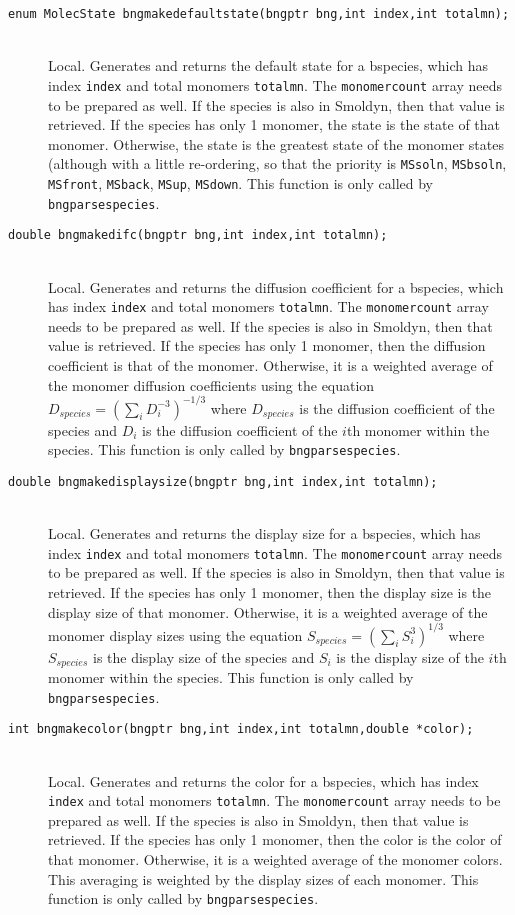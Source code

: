 \documentclass {scrbook}
\newcommand {\ttt} {\texttt}
\begin{document}
\begin{description}
\item[\ttt{enum MolecState bngmakedefaultstate(bngptr bng,int index,int totalmn);}]
\hfill \\
Local. Generates and returns the default state for a bspecies, which has index \ttt{index} and total monomers \ttt{totalmn}. The \ttt{monomercount} array needs to be prepared as well. If the species is also in Smoldyn, then that value is retrieved. If the species has only 1 monomer, the state is the state of that monomer. Otherwise, the state is the greatest state of the monomer states (although with a little re-ordering, so that the priority is \ttt{MSsoln}, \ttt{MSbsoln}, \ttt{MSfront}, \ttt{MSback}, \ttt{MSup}, \ttt{MSdown}. This function is only called by \ttt{bngparsespecies}.

\item[\ttt{double bngmakedifc(bngptr bng,int index,int totalmn);}]
\hfill \\
Local. Generates and returns the diffusion coefficient for a bspecies, which has index \ttt{index} and total monomers \ttt{totalmn}. The \ttt{monomercount} array needs to be prepared as well. If the species is also in Smoldyn, then that value is retrieved. If the species has only 1 monomer, then the diffusion coefficient is that of the monomer. Otherwise, it is a weighted average of the monomer diffusion coefficients using the equation
$D_{species} = (\sum_{i} D_i^{-3})^{-1/3}$
where $D_{species}$ is the diffusion coefficient of the species and $D_i$ is the diffusion coefficient of the $i$th monomer within the species. This function is only called by \ttt{bngparsespecies}.

\item[\ttt{double bngmakedisplaysize(bngptr bng,int index,int totalmn);}]
\hfill \\
Local. Generates and returns the display size for a bspecies, which has index \ttt{index} and total monomers \ttt{totalmn}. The \ttt{monomercount} array needs to be prepared as well. If the species is also in Smoldyn, then that value is retrieved. If the species has only 1 monomer, then the display size is the display size of that monomer. Otherwise, it is a weighted average of the monomer display sizes using the equation
$S_{species} = (\sum_{i} S_i^{3})^{1/3}$
where $S_{species}$ is the display size of the species and $S_i$ is the display size of the $i$th monomer within the species. This function is only called by \ttt{bngparsespecies}.

\item[\ttt{int bngmakecolor(bngptr bng,int index,int totalmn,double *color);}]
\hfill \\
Local. Generates and returns the color for a bspecies, which has index \ttt{index} and total monomers \ttt{totalmn}. The \ttt{monomercount} array needs to be prepared as well. If the species is also in Smoldyn, then that value is retrieved. If the species has only 1 monomer, then the color is the color of that monomer. Otherwise, it is a weighted average of the monomer colors. This averaging is weighted by the display sizes of each monomer. This function is only called by \ttt{bngparsespecies}.


\end{description}
\end{document}
